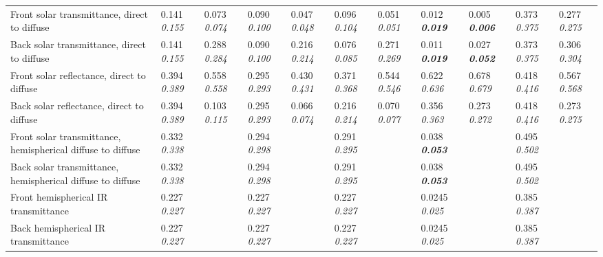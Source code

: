 \begin{longtable}[c]{p{1.0in}p{0.4in}p{0.4in}p{0.4in}p{0.4in}p{0.4in}p{0.4in}p{0.4in}p{0.4in}p{0.4in}p{0.4in}}
Front solar transmittance, direct to diffuse & 0.141 \quad \quad \textit{0.155} & 0.073 \quad \quad \textit{0.074} & 0.090 \quad \quad \textit{0.100} & 0.047 \quad \quad \textit{0.048} & 0.096 \quad \quad \textit{0.104} & 0.051 \quad \quad \textit{0.051} & 0.012 \quad \quad \textbf{\textit{0.019}} & 0.005 \quad \quad \textbf{\textit{0.006}} & 0.373 \quad \quad \textit{0.375} & 0.277 \quad \quad \textit{0.275} \tabularnewline
Back solar transmittance, direct to diffuse & 0.141 \quad \quad \textit{0.155} & 0.288 \quad \quad \textit{0.284} & 0.090 \quad \quad \textit{0.100} & 0.216 \quad \quad \textit{0.214} & 0.076 \quad \quad \textit{0.085} & 0.271 \quad \quad \textit{0.269} & 0.011 \quad \quad \textbf{\textit{0.019}} & 0.027 \quad \quad \textbf{\textit{0.052}} & 0.373 \quad \quad \textit{0.375} & 0.306 \quad \quad \textit{0.304} \tabularnewline
Front solar reflectance, direct to diffuse & 0.394 \quad \quad \textit{0.389} & 0.558 \quad \quad \textit{0.558} & 0.295 \quad \quad \textit{0.293} & 0.430 \quad \quad \textit{0.431} & 0.371 \quad \quad \textit{0.368} & 0.544 \quad \quad \textit{0.546} & 0.622 \quad \quad \textit{0.636} & 0.678 \quad \quad \textit{0.679} & 0.418 \quad \quad \textit{0.416} & 0.567 \quad \quad \textit{0.568} \tabularnewline
Back solar reflectance, direct to diffuse & 0.394 \quad \quad \textit{0.389} & 0.103 \quad \quad \textit{0.115} & 0.295 \quad \quad \textit{0.293} & 0.066 \quad \quad \textit{0.074} & 0.216 \quad \quad \textit{0.214} & 0.070 \quad \quad \textit{0.077} & 0.356 \quad \quad \textit{0.363} & 0.273 \quad \quad \textit{0.272} & 0.418 \quad \quad \textit{0.416} & 0.273 \quad \quad \textit{0.275} \tabularnewline
Front solar transmittance, hemispherical diffuse to diffuse & 0.332 \quad \quad \textit{0.338} &  & 0.294 \quad \quad \textit{0.298} &  & 0.291 \quad \quad \textit{0.295} &  & 0.038 \quad \quad \textbf{\textit{0.053}} &  & 0.495 \quad \quad \textit{0.502} \tabularnewline
Back solar transmittance, hemispherical diffuse to diffuse & 0.332 \quad \quad \textit{0.338} &  & 0.294 \quad \quad \textit{0.298} &  & 0.291 \quad \quad \textit{0.295} &  & 0.038 \quad \quad \textbf{\textit{0.053}} &  & 0.495 \quad \quad \textit{0.502} &  \tabularnewline
Front hemispherical IR transmittance & 0.227 \quad \quad \textit{0.227} &  & 0.227 \quad \quad \textit{0.227} &  & 0.227 \quad \quad \textit{0.227} &  & 0.0245 \quad \quad \textit{0.025} &  & 0.385 \quad \quad \textit{0.387} &  \tabularnewline
Back hemispherical IR transmittance & 0.227 \quad \quad \textit{0.227} &  & 0.227 \quad \quad \textit{0.227} &  & 0.227 \quad \quad \textit{0.227} &  & 0.0245 \quad \quad \textit{0.025} &  & 0.385 \quad \quad \textit{0.387} &  \tabularnewline

\end{longtable}
